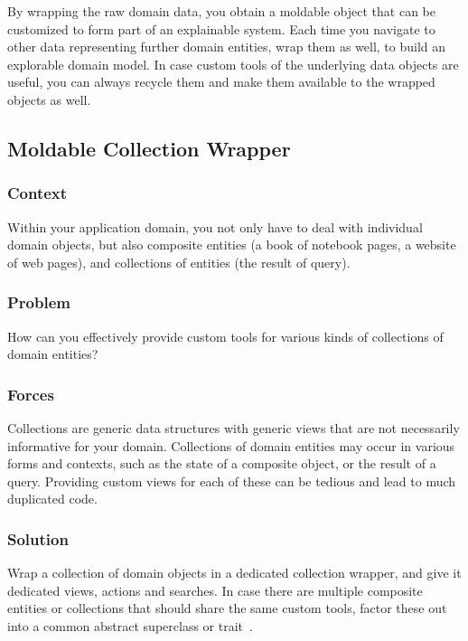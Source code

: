 \documentclass[sigconf]{acmart}
\renewcommand{\nbc}[3]{} %
\newcommand\on[1]{\nbc{ON}{#1}{olive}} %
\begin{document}
By wrapping the raw domain data, you obtain a moldable object that can be customized to form part of an explainable system.
Each time you navigate to other data representing further domain entities, wrap them as well, to build an explorable domain model.
In case custom tools of the underlying data objects are useful, you can always recycle them and make them available to the wrapped objects as well.

\subsection*{Moldable Collection Wrapper}\label{pat:collectionWrapper}

\subsubsection*{Context}
Within your application domain, you not only have to deal with individual domain objects, but also composite entities (\eg a book of notebook pages, a website of web pages), and collections of entities (\eg the result of query).

\subsubsection*{Problem}
How can you effectively provide custom tools for various kinds of collections of domain entities?

\subsubsection*{Forces}
Collections are generic data structures with generic views that are not necessarily informative for your domain.
Collections of domain entities may occur in various forms and contexts, such as the state of a composite object, or the result of a query.
Providing custom views for each of these can be tedious and lead to much duplicated code.

\subsubsection*{Solution}
Wrap a collection of domain objects in a dedicated collection wrapper, and give it dedicated views, actions and searches.
In case there are multiple composite entities or collections that should share the same custom tools, factor these out into a common abstract superclass or trait~\cite{Duca06b}.
\end{document}
